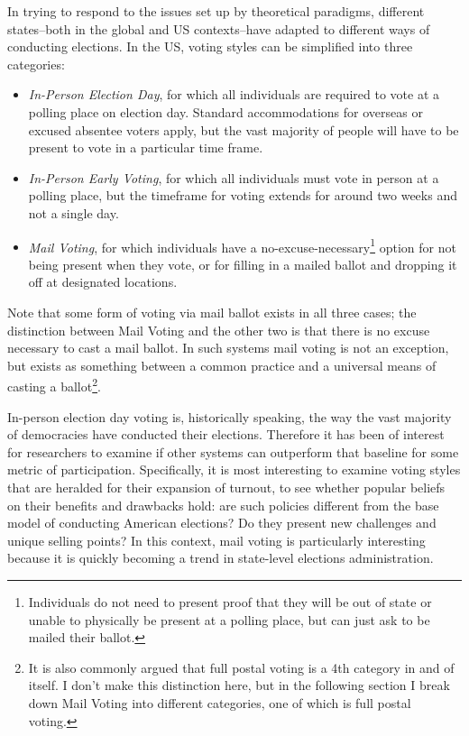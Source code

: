 \documentclass[12pt,twoside]{reedthesis}
\begin{document}
  In trying to respond to the issues set up by theoretical paradigms,
  different states--both in the global and US contexts--have adapted to
  different ways of conducting elections. In the US, voting styles can be
  simplified into three categories:
  
  \begin{itemize}
  \item
    \emph{In-Person Election Day}, for which all individuals are required
    to vote at a polling place on election day. Standard accommodations
    for overseas or excused absentee voters apply, but the vast majority
    of people will have to be present to vote in a particular time frame.
  \item
    \emph{In-Person Early Voting}, for which all individuals must vote in
    person at a polling place, but the timeframe for voting extends for
    around two weeks and not a single day.
  \item
    \emph{Mail Voting}, for which individuals have a
    no-excuse-necessary\footnote{Individuals do not need to present proof
      that they will be out of state or unable to physically be present at
      a polling place, but can just ask to be mailed their ballot.} option
    for not being present when they vote, or for filling in a mailed
    ballot and dropping it off at designated locations.
  \end{itemize}
  
  Note that some form of voting via mail ballot exists in all three cases;
  the distinction between Mail Voting and the other two is that there is
  no excuse necessary to cast a mail ballot. In such systems mail voting
  is not an exception, but exists as something between a common practice
  and a universal means of casting a ballot\footnote{It is also commonly
    argued that full postal voting is a 4th category in and of itself. I
    don't make this distinction here, but in the following section I break
    down Mail Voting into different categories, one of which is full
    postal voting.}.
  
  In-person election day voting is, historically speaking, the way the
  vast majority of democracies have conducted their elections. Therefore
  it has been of interest for researchers to examine if other systems can
  outperform that baseline for some metric of participation. Specifically,
  it is most interesting to examine voting styles that are heralded for
  their expansion of turnout, to see whether popular beliefs on their
  benefits and drawbacks hold: are such policies different from the base
  model of conducting American elections? Do they present new challenges
  and unique selling points? In this context, mail voting is particularly
  interesting because it is quickly becoming a trend in state-level
  elections administration.
  
\end{document}
